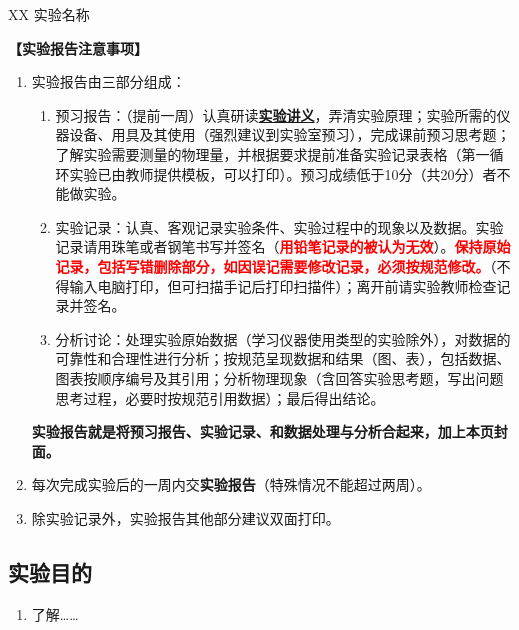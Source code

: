 \documentclass[dvipsnames, svgnames,a4paper,11pt]{article}
\begin{document}
\scoresTable{}{}{}{}{}{}{}{}


\begin{center}
	\LARGE XX \quad 实验名称
\end{center}

\textbf{【实验报告注意事项】}
\begin{enumerate}
	\item 实验报告由三部分组成：
	\begin{enumerate}
		\item 预习报告：（提前一周）认真研读\underline{\textbf{实验讲义}}，弄清实验原理；实验所需的仪器设备、用具及其使用（强烈建议到实验室预习），完成课前预习思考题；了解实验需要测量的物理量，并根据要求提前准备实验记录表格（第一循环实验已由教师提供模板，可以打印）。预习成绩低于10分（共20分）者不能做实验。
	    \item 实验记录：认真、客观记录实验条件、实验过程中的现象以及数据。实验记录请用珠笔或者钢笔书写并签名（\textcolor{red}{\textbf{用铅笔记录的被认为无效}}）。\textcolor{red}{\textbf{保持原始记录，包括写错删除部分，如因误记需要修改记录，必须按规范修改。}}（不得输入电脑打印，但可扫描手记后打印扫描件）；离开前请实验教师检查记录并签名。
	    \item 分析讨论：处理实验原始数据（学习仪器使用类型的实验除外），对数据的可靠性和合理性进行分析；按规范呈现数据和结果（图、表），包括数据、图表按顺序编号及其引用；分析物理现象（含回答实验思考题，写出问题思考过程，必要时按规范引用数据）；最后得出结论。
	\end{enumerate}
	\textbf{实验报告就是将预习报告、实验记录、和数据处理与分析合起来，加上本页封面。}
	\item 每次完成实验后的一周内交\textbf{实验报告}（特殊情况不能超过两周）。
	\item 除实验记录外，实验报告其他部分建议双面打印。
\end{enumerate}


\clearpage
\tableofcontents
\clearpage

\setcounter{section}{0}
	
\subsection{实验目的}
\begin{enumerate}
	\item 了解……
\end{enumerate}
\end{document}

